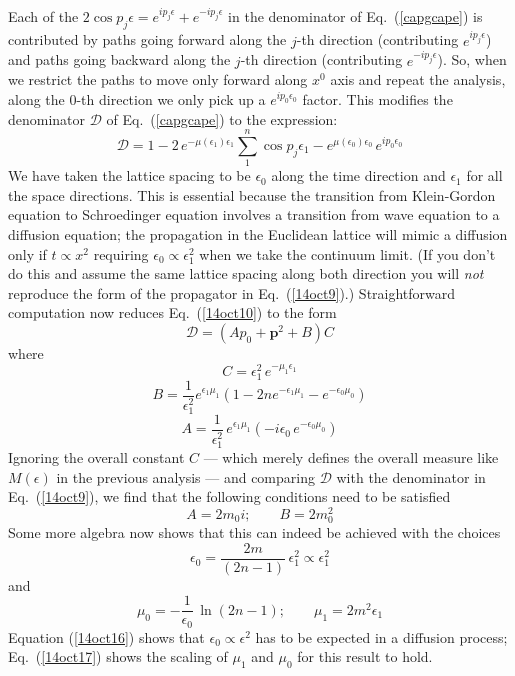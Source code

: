 \documentclass[12pt]{article}
\def\eq#1{{Eq.~(\ref{#1})}}
\begin{document}
Each of the $2\cos p_j \epsilon = e^{ip_j \epsilon} + e^{-ip_j\epsilon}$ in the denominator of \eq{capgcape} is contributed by paths going forward along the $j$-th direction (contributing $
e^{ip_j \epsilon}$) and paths going backward along the $j$-th direction (contributing $ e^{-ip_j\epsilon}$). 
So, when we restrict the paths to move only forward along $x^0$ axis and repeat the analysis,  along the $0$-th direction we only pick up a $e^{ip_0\epsilon_0}$ factor.
This modifies the denominator $\mathcal{D}$ of \eq{capgcape} to the expression:
\begin{equation}
 \mathcal{D} = 1 - 2\, e^{-\mu(\epsilon_1)\epsilon_1} \sum_1^n \cos p_j \epsilon_1 - e^{\mu(\epsilon_0)\epsilon_0} \, e^{i p_0 \epsilon_0}
 \label{14oct10} 
\end{equation} 
 We have taken the lattice spacing to be $\epsilon_0$ along the time direction and $\epsilon_1$ for all the space directions. This is  essential because the transition from Klein-Gordon equation to Schroedinger equation involves a transition from wave equation to a diffusion equation; the propagation in the Euclidean lattice will mimic a diffusion only if $t\propto x^2$ requiring $\epsilon_0\propto \epsilon_1^2$ when we take the continuum limit. (If you don't do this and assume the same lattice spacing along both direction you will \textit{not} reproduce the form of the propagator in \eq{14oct9}.) Straightforward computation now reduces \eq{14oct10}  to the form 
\begin{equation}
 \mathcal{D} = (A p_0 + \bm{p}^2 +B) C
\end{equation} 
 where 
 \begin{equation}
  C=\epsilon_1^2 \, e^{-\mu_1 \epsilon_1}
 \end{equation} 
 \begin{equation}
  B = \frac{1}{\epsilon_1^2} e^{\epsilon_1\mu_1} \left(1- 2 n e^{-\epsilon_1\mu_1} - e^{-\epsilon_0\mu_0}\right)
 \end{equation} 
 \begin{equation}
 A = \frac{1}{\epsilon_1^2} \, e^{\epsilon_1\mu_1} \left( -i\epsilon_0 \, e^{-\epsilon_0\mu_0}\right)
 \end{equation} 
 Ignoring the overall constant $C$ --- which merely defines the overall measure like $M(\epsilon)$ in the previous analysis --- and comparing $\mathcal{D}$ with the denominator in \eq{14oct9}, we find that  the following conditions need to be satisfied
 \begin{equation}
 A = 2 m_0 i; \qquad B=  2 m_0^2
 \end{equation} 
 Some more algebra now shows that this can indeed be achieved with the choices 
 \begin{equation}
 \epsilon_0 = \frac{2m}{(2n-1)}\, \epsilon_1^2 \propto \epsilon_1^2
  \label{14oct16}
 \end{equation} 
 and 
 \begin{equation}
  \mu_0 = - \frac{1}{\epsilon_0} \, \ln(2n-1); \qquad \mu_1 = 2m^2 \epsilon_1
  \label{14oct17}
 \end{equation} 
 Equation (\ref{14oct16}) shows that $\epsilon_0\propto \epsilon^2$ has to be expected in a diffusion process; \eq{14oct17} shows the scaling of $\mu_1$ and $\mu_0$ for this result to hold. 
 
\end{document}
